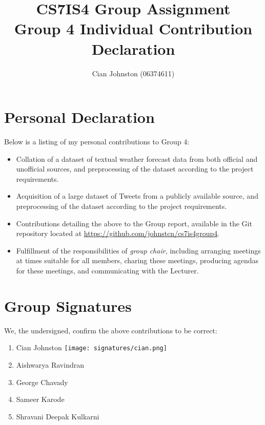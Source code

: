 \documentclass[a4paper,10pt]{article}
\begin{document}
\title{
    CS7IS4 Group Assignment \\
    \large Group 4 Individual Contribution Declaration
}
\author{
    Cian Johnston (06374611)
}

\maketitle

\section{Personal Declaration}

Below is a listing of my personal contributions to Group 4:

\begin{itemize}
    \item{
        Collation of a dataset of textual weather forecast data from both official and unofficial sources, and preprocessing of the dataset according to the project requirements.
    }
    \item{
        Acquisition of a large dataset of Tweets from a publicly available source, and preprocessing of the dataset according to the project requirements.
    }
    \item{
        Contributions detailing the above to the Group report, available in the Git repository located at \url{https://github.com/johnstcn/cs7is4group4}.
    }
    \item{
        Fulfillment of the responsibilities of \textit{group chair}, including arranging meetings at times suitable for all members, charing these meetings, producing agendas for these meetings, and communicating with the Lecturer. 
    }
\end{itemize}

\section{Group Signatures}

We, the undersigned, confirm the above contributions to be correct:

\begin{enumerate}
    \item{
        Cian Johnston \texttt{[image: signatures/cian.png]}
    }
    \item{
        Aishwarya Ravindran
    }
    \item{
        George Chavady
    }
    \item{
        Sameer Karode
    }
    \item{
        Shravani Deepak Kulkarni
    }

\end{enumerate}
\end{document}
